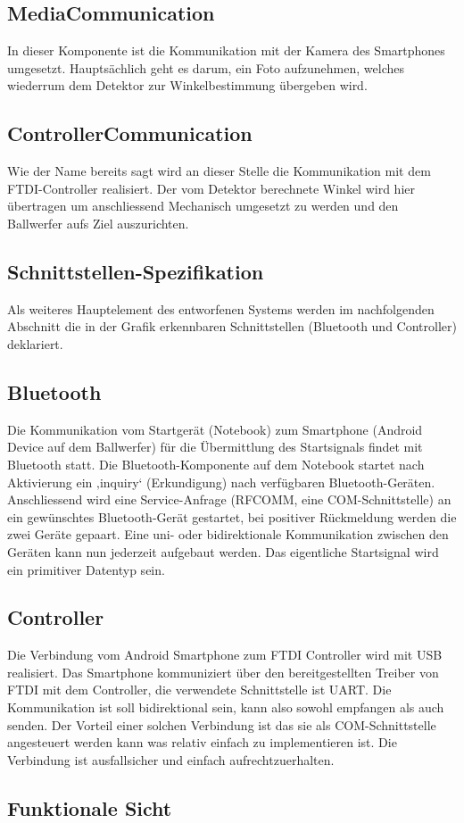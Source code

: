 		\subsection{MediaCommunication}
		In dieser Komponente ist die Kommunikation mit der Kamera des Smartphones umgesetzt. Hauptsächlich geht es darum, ein Foto aufzunehmen, welches wiederrum dem Detektor zur Winkelbestimmung übergeben wird.
		
		\subsection{ControllerCommunication}
		Wie der Name bereits sagt wird an dieser Stelle die Kommunikation mit dem FTDI-Controller realisiert. Der vom Detektor berechnete Winkel wird hier übertragen um anschliessend Mechanisch umgesetzt zu werden und den Ballwerfer aufs Ziel auszurichten.
		
	\subsection{Schnittstellen-Spezifikation}
		Als weiteres Hauptelement des entworfenen Systems werden im nachfolgenden Abschnitt die in der Grafik erkennbaren Schnittstellen (Bluetooth und Controller) deklariert.
		
		\subsection{Bluetooth}
		Die Kommunikation vom Startgerät (Notebook) zum Smartphone (Android Device auf dem Ballwerfer) für die Übermittlung des Startsignals findet mit Bluetooth statt. Die Bluetooth-Komponente auf dem Notebook startet nach Aktivierung ein ‚inquiry‘ (Erkundigung) nach verfügbaren Bluetooth-Geräten. Anschliessend wird eine Service-Anfrage (RFCOMM, eine COM-Schnittstelle) an ein gewünschtes Bluetooth-Gerät gestartet, bei positiver Rückmeldung werden die zwei Geräte gepaart. Eine uni- oder bidirektionale Kommunikation zwischen den Geräten kann nun jederzeit aufgebaut werden. Das eigentliche Startsignal wird ein primitiver Datentyp sein.
		
		\subsection{Controller}
		Die Verbindung vom Android Smartphone zum FTDI Controller wird mit USB realisiert. 
		Das Smartphone kommuniziert über den bereitgestellten Treiber von FTDI mit dem Controller, die verwendete Schnittstelle ist UART. Die Kommunikation ist soll bidirektional sein, kann also sowohl empfangen als auch senden. Der Vorteil einer solchen Verbindung ist das sie als COM-Schnittstelle angesteuert werden kann was relativ einfach zu implementieren ist. Die Verbindung ist ausfallsicher und einfach aufrechtzuerhalten.		
		
	\subsection{Funktionale Sicht}
